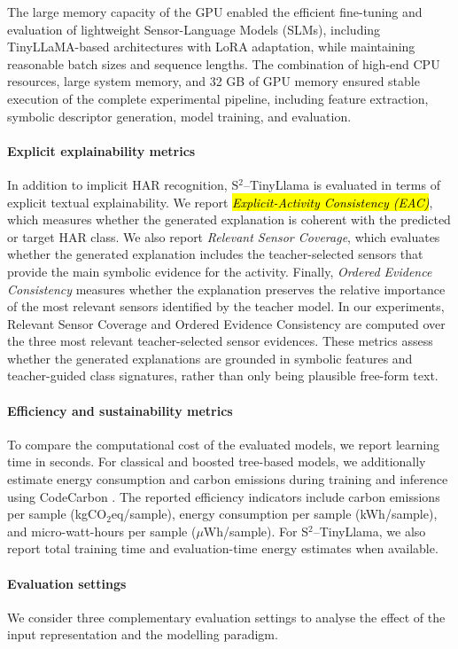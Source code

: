 \documentclass[preprint,12pt]{elsarticle}
\begin{document}
The large memory capacity of the GPU enabled the efficient fine-tuning and evaluation of lightweight Sensor-Language Models (SLMs), including TinyLLaMA-based architectures with LoRA adaptation, while maintaining reasonable batch sizes and sequence lengths. The combination of high-end CPU resources, large system memory, and 32 GB of GPU memory ensured stable execution of the complete experimental pipeline, including feature extraction, symbolic descriptor generation, model training, and evaluation.


\paragraph{Explicit explainability metrics}
In addition to implicit HAR recognition, S$^2$--TinyLlama is evaluated in terms of explicit textual explainability. We report \emph{\hl{Explicit-Activity Consistency (EAC)}}, which measures whether the generated explanation is coherent with the predicted or target HAR class. We also report \emph{Relevant Sensor Coverage}, which evaluates whether the generated explanation includes the teacher-selected sensors that provide the main symbolic evidence for the activity. Finally, \emph{Ordered Evidence Consistency} measures whether the explanation preserves the relative importance of the most relevant sensors identified by the teacher model. In our experiments, Relevant Sensor Coverage and Ordered Evidence Consistency are computed over the three most relevant teacher-selected sensor evidences. These metrics assess whether the generated explanations are grounded in symbolic features and teacher-guided class signatures, rather than only being plausible free-form text.

\paragraph{Efficiency and sustainability metrics}
To compare the computational cost of the evaluated models, we report learning time in seconds. For classical and boosted tree-based models, we additionally estimate energy consumption and carbon emissions during training and inference using CodeCarbon \cite{fischer2025ground}. The reported efficiency indicators include carbon emissions per sample (kgCO$_2$eq/sample), energy consumption per sample (kWh/sample), and micro-watt-hours per sample ($\mu$Wh/sample). For S$^2$--TinyLlama, we also report total training time and evaluation-time energy estimates when available. 

\paragraph{Evaluation settings}
We consider three complementary evaluation settings to analyse the effect of the input representation and the modelling paradigm.
\end{document}
